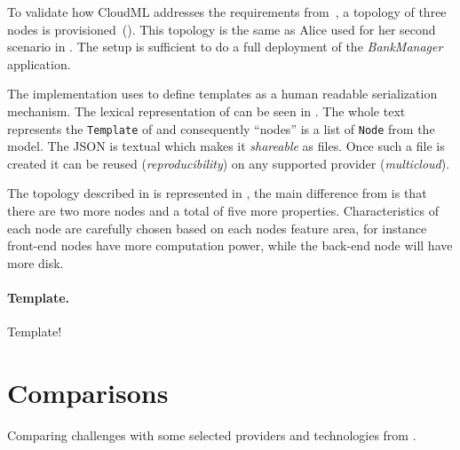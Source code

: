 
To validate how CloudML addresses the requirements from~,
a topology of three nodes is provisioned~().
This topology is the same as Alice used for her second scenario in .
The setup is sufficient to do a full deployment of the \emph{BankManager} application.

The implementation uses  to define templates as a human readable serialization mechanism.
The lexical representation of  can be seen in . 
The whole text represents the \texttt{Template} of  and consequently 
``nodes'' is a list of \texttt{Node} from the model.
The JSON is textual which makes it \emph{shareable} as files.
Once such a file is created it can be reused (\emph{reproducibility}) 
on any supported provider (\emph{multicloud}).

The topology described in  is represented in ,
the main difference from  is that there are two more nodes and a total of 
five more properties.
Characteristics of each node are carefully chosen based on each nodes feature area, for instance 
front-end nodes have more computation power, while the back-end node will have more disk.

\paragraph{Template.}


Template!

\section{Comparisons}


Comparing challenges with some selected providers and technologies from .
